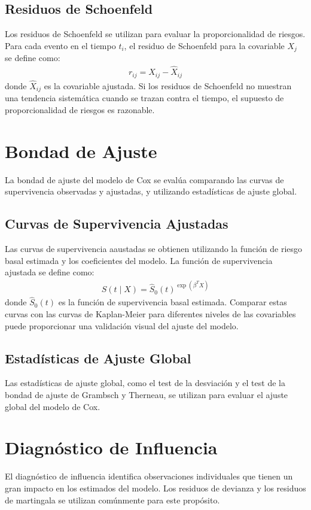 \documentclass[a4paper]{report} %
\begin{document}
\subsection{Residuos de Schoenfeld}
Los residuos de Schoenfeld se utilizan para evaluar la proporcionalidad de riesgos. Para cada evento en el tiempo $t_i$, el residuo de Schoenfeld para la covariable $X_j$ se define como:
\begin{eqnarray*}
r_{ij} = X_{ij} - \hat{X}_{ij}
\end{eqnarray*}
donde $\hat{X}_{ij}$ es la covariable ajustada. Si los residuos de Schoenfeld no muestran una tendencia sistem\'atica cuando se trazan contra el tiempo, el supuesto de proporcionalidad de riesgos es razonable.

\section{Bondad de Ajuste}
La bondad de ajuste del modelo de Cox se eval\'ua comparando las curvas de supervivencia observadas y ajustadas, y utilizando estad\'isticas de ajuste global.

\subsection{Curvas de Supervivencia Ajustadas}
Las curvas de supervivencia aaustadas se obtienen utilizando la funci\'on de riesgo basal estimada y los coeficientes del modelo. La funci\'on de supervivencia ajustada se define como:
\begin{eqnarray*}
\hat{S}(t \mid X) = \hat{S}_0(t)^{\exp(\beta^T X)}
\end{eqnarray*}
donde $\hat{S}_0(t)$ es la funci\'on de supervivencia basal estimada. Comparar estas curvas con las curvas de Kaplan-Meier para diferentes niveles de las covariables puede proporcionar una validaci\'on visual del ajuste del modelo.

\subsection{Estad\'isticas de Ajuste Global}
Las estad\'isticas de ajuste global, como el test de la desviaci\'on y el test de la bondad de ajuste de Grambsch y Therneau, se utilizan para evaluar el ajuste global del modelo de Cox.

\section{Diagn\'ostico de Influencia}
El diagn\'ostico de influencia identifica observaciones individuales que tienen un gran impacto en los estimados del modelo. Los residuos de devianza y los residuos de martingala se utilizan com\'unmente para este prop\'osito.
\end{document}
